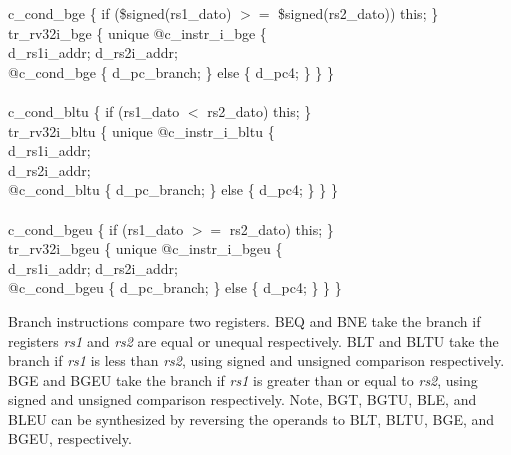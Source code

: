 {%
\indent c\_cond\_bge \{ if (\$signed(rs1\_dato) $>=$ \$signed(rs2\_dato)) this; \}\\%
\indent tr\_rv32i\_bge \{ unique @c\_instr\_i\_bge \{ \\%
\indent \hspace{\parindent} d\_rs1i\_addr; d\_rs2i\_addr; \\%
\indent \hspace{\parindent} @c\_cond\_bge \{ d\_pc\_branch; \}  	else \{ d\_pc4; \} \} \} \\%
\\
\indent c\_cond\_bltu \{ if (rs1\_dato $<$ rs2\_dato) this; \}\\%
\indent tr\_rv32i\_bltu \{ unique @c\_instr\_i\_bltu \{ \\%
\indent \hspace{\parindent} d\_rs1i\_addr; \\%
\indent \hspace{\parindent} d\_rs2i\_addr; \\%
\indent \hspace{\parindent} @c\_cond\_bltu \{ d\_pc\_branch; \}  	else \{ d\_pc4; \} \} \} \\%
\\
\indent c\_cond\_bgeu \{ if (rs1\_dato $>=$ rs2\_dato) this; \}\\%
\indent tr\_rv32i\_bgeu \{ unique @c\_instr\_i\_bgeu \{ \\%
\indent \hspace{\parindent} d\_rs1i\_addr; d\_rs2i\_addr; \\%
\indent \hspace{\parindent} @c\_cond\_bgeu \{ d\_pc\_branch; \}  	else \{ d\_pc4; \} \} \} \\%
}

Branch instructions compare two registers.  BEQ and BNE take the
branch if registers {\em rs1} and {\em rs2} are equal or unequal
respectively.  BLT and BLTU take the branch if {\em rs1} is less than
{\em rs2}, using signed and unsigned comparison respectively.  BGE and
BGEU take the branch if {\em rs1} is greater than or equal to {\em rs2},
using signed and unsigned comparison respectively. Note, BGT, BGTU,
BLE, and BLEU can be synthesized by reversing the operands to BLT,
BLTU, BGE, and BGEU, respectively.

